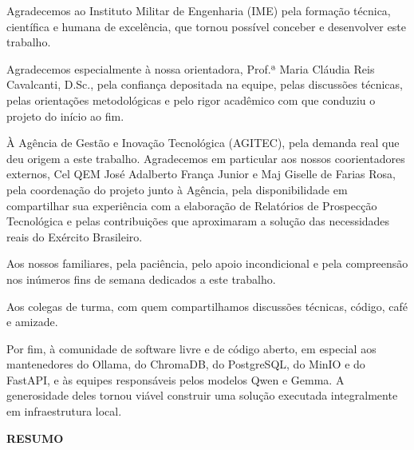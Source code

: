 \documentclass[12pt, a4paper]{article}
\begin{document}
\begin{onehalfspace}
Agradecemos ao Instituto Militar de Engenharia (IME) pela formação técnica,
científica e humana de excelência, que tornou possível conceber e desenvolver
este trabalho.

Agradecemos especialmente à nossa orientadora, Prof.ª Maria Cláudia Reis
Cavalcanti, D.Sc., pela confiança depositada na equipe, pelas discussões
técnicas, pelas orientações metodológicas e pelo rigor acadêmico com que
conduziu o projeto do início ao fim.

À Agência de Gestão e Inovação Tecnológica (AGITEC), pela demanda real que deu
origem a este trabalho. Agradecemos em particular aos nossos coorientadores
externos, Cel QEM José Adalberto França Junior e Maj Giselle de Farias Rosa,
pela coordenação do projeto junto à Agência, pela disponibilidade em
compartilhar sua experiência com a elaboração de Relatórios de Prospecção
Tecnológica e pelas contribuições que aproximaram a solução das necessidades
reais do Exército Brasileiro.

Aos nossos familiares, pela paciência, pelo apoio incondicional e pela
compreensão nos inúmeros fins de semana dedicados a este trabalho.

Aos colegas de turma, com quem compartilhamos discussões técnicas, código, café
e amizade.

Por fim, à comunidade de software livre e de código aberto, em especial aos
mantenedores do Ollama, do ChromaDB, do PostgreSQL, do MinIO e do FastAPI, e às
equipes responsáveis pelos modelos Qwen e Gemma. A generosidade deles tornou
viável construir uma solução executada integralmente em infraestrutura local.
\end{onehalfspace}

\newpage

\begin{center}
  {\fontsize{12}{14}\selectfont\bfseries RESUMO}
\end{center}

\vspace{0.6cm}
\end{document}
